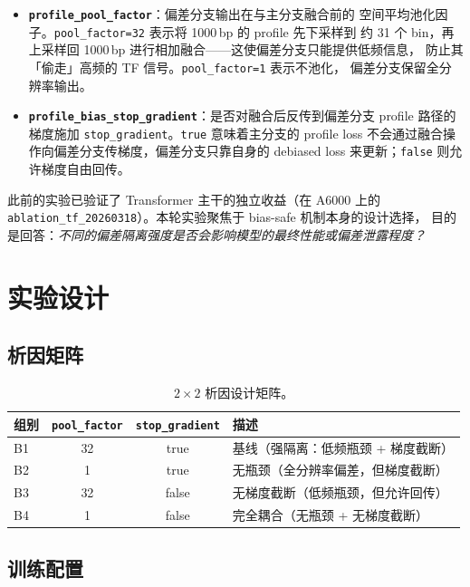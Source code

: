 \documentclass[11pt,a4paper]{ctexart}
\begin{document}
\begin{itemize}[leftmargin=2em]
  \item \textbf{\texttt{profile\_pool\_factor}}：偏差分支输出在与主分支融合前的
    空间平均池化因子。\texttt{pool\_factor=32} 表示将 1000\,bp 的 profile 先下采样到
    约 31 个 bin，再上采样回 1000\,bp 进行相加融合——这使偏差分支只能提供低频信息，
    防止其「偷走」高频的 TF 信号。\texttt{pool\_factor=1} 表示不池化，
    偏差分支保留全分辨率输出。
  \item \textbf{\texttt{profile\_bias\_stop\_gradient}}：是否对融合后反传到偏差分支
    profile 路径的梯度施加 \texttt{stop\_gradient}。\texttt{true} 意味着主分支的
    profile loss 不会通过融合操作向偏差分支传梯度，偏差分支只靠自身的 debiased loss
    来更新；\texttt{false} 则允许梯度自由回传。
\end{itemize}

此前的实验已验证了 Transformer 主干的独立收益（在 A6000 上的
\texttt{ablation\_tf\_20260318}）。本轮实验聚焦于 bias-safe 机制本身的设计选择，
目的是回答：\emph{不同的偏差隔离强度是否会影响模型的最终性能或偏差泄露程度？}

\section{实验设计}

\subsection{析因矩阵}

\begin{table}[H]
\centering
\caption{$2 \times 2$ 析因设计矩阵。}
\label{tab:factorial}
\begin{tabular}{lccl}
\toprule
组别 & \texttt{pool\_factor} & \texttt{stop\_gradient} & 描述 \\
\midrule
B1 & 32 & true  & 基线（强隔离：低频瓶颈 + 梯度截断） \\
B2 & 1  & true  & 无瓶颈（全分辨率偏差，但梯度截断） \\
B3 & 32 & false & 无梯度截断（低频瓶颈，但允许回传） \\
B4 & 1  & false & 完全耦合（无瓶颈 + 无梯度截断） \\
\bottomrule
\end{tabular}
\end{table}

\subsection{训练配置}
\end{document}
